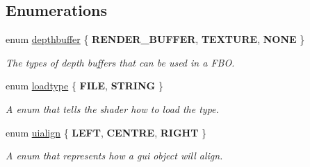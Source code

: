 \subsection*{Enumerations}
\begin{DoxyCompactItemize}
\item 
enum \hyperlink{namespaceflounder_aed09c736167e783c910ec9e58479b57c}{depthbuffer} \{ {\bfseries R\+E\+N\+D\+E\+R\+\_\+\+B\+U\+F\+F\+ER}, 
{\bfseries T\+E\+X\+T\+U\+RE}, 
{\bfseries N\+O\+NE}
 \}\begin{DoxyCompactList}\small\item\em The types of depth buffers that can be used in a F\+BO. \end{DoxyCompactList}
\item 
enum \hyperlink{namespaceflounder_a69b4e6ffcd64f6175546ca0942d18565}{loadtype} \{ {\bfseries F\+I\+LE}, 
{\bfseries S\+T\+R\+I\+NG}
 \}\begin{DoxyCompactList}\small\item\em A enum that tells the shader how to load the type. \end{DoxyCompactList}
\item 
enum \hyperlink{namespaceflounder_a70f1871d5c05aa8e078dd37501ce10a9}{uialign} \{ {\bfseries L\+E\+FT}, 
{\bfseries C\+E\+N\+T\+RE}, 
{\bfseries R\+I\+G\+HT}
 \}\begin{DoxyCompactList}\small\item\em A enum that represents how a gui object will align. \end{DoxyCompactList}
\end{DoxyCompactItemize}

